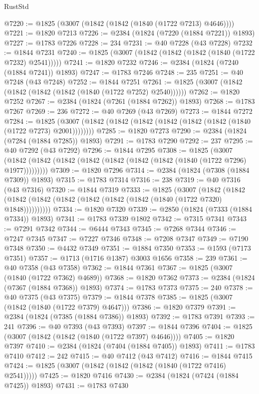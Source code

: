 \begin{lexlean}{RustStd}
\begin{coremodule}
@7220 := @1825 (@3007 (@1842 (@1842 (@1840 (@1722 @7213) @4646))))
@7221 := @1820 @7213
@7226 := @2384 (@1824 (@7220 (@1884 @7221)) @1893)
@7227 := @1783 @7226
@7228 := 234
@7231 := @40 @7228 (@43 @7228)
@7232 := @1844 @7231
@7240 := @1825 (@3007 (@1842 (@1842 (@1842 (@1840 (@1722 @7232) @2541)))))
@7241 := @1820 @7232
@7246 := @2384 (@1824 (@7240 (@1884 @7241)) @1893)
@7247 := @1783 @7246
@7248 := 235
@7251 := @40 @7248 (@43 @7248)
@7252 := @1844 @7251
@7261 := @1825 (@3007 (@1842 (@1842 (@1842 (@1842 (@1840 (@1722 @7252) @2540))))))
@7262 := @1820 @7252
@7267 := @2384 (@1824 (@7261 (@1884 @7262)) @1893)
@7268 := @1783 @7267
@7269 := 236
@7272 := @40 @7269 (@43 @7269)
@7273 := @1844 @7272
@7284 := @1825 (@3007 (@1842 (@1842 (@1842 (@1842 (@1842 (@1842 (@1840 (@1722 @7273) @2001))))))))
@7285 := @1820 @7273
@7290 := @2384 (@1824 (@7284 (@1884 @7285)) @1893)
@7291 := @1783 @7290
@7292 := 237
@7295 := @40 @7292 (@43 @7292)
@7296 := @1844 @7295
@7308 := @1825
    (@3007 (@1842 (@1842 (@1842 (@1842 (@1842 (@1842 (@1842 (@1840 (@1722 @7296) @1977)))))))))
@7309 := @1820 @7296
@7314 := @2384 (@1824 (@7308 (@1884 @7309)) @1893)
@7315 := @1783 @7314
@7316 := 238
@7319 := @40 @7316 (@43 @7316)
@7320 := @1844 @7319
@7333 := @1825
    (@3007
      (@1842 (@1842 (@1842 (@1842 (@1842 (@1842 (@1842 (@1842 (@1840 (@1722 @7320) @1848))))))))))
@7334 := @1820 @7320
@7339 := @2850 (@1824 (@7333 (@1884 @7334)) @1893)
@7341 := @1783 @7339 @1802
@7342 := @7315 @7341
@7343 := @7291 @7342
@7344 := @6444 @7343
@7345 := @7268 @7344
@7346 := @7247 @7345
@7347 := @7227 @7346
@7348 := @7208 @7347
@7349 := @7190 @7348
@7350 := @4432 @7349
@7351 := @1884 @7350
@7353 := @1593 (@7173 @7351)
@7357 := @1713 (@1716 @1387) @3003 @1656
@7358 := 239
@7361 := @40 @7358 (@43 @7358)
@7362 := @1844 @7361
@7367 := @1825 (@3007 (@1840 (@1722 @7362) @4689))
@7368 := @1820 @7362
@7373 := @2384 (@1824 (@7367 (@1884 @7368)) @1893)
@7374 := @1783 @7373
@7375 := 240
@7378 := @40 @7375 (@43 @7375)
@7379 := @1844 @7378
@7385 := @1825 (@3007 (@1842 (@1840 (@1722 @7379) @4647)))
@7386 := @1820 @7379
@7391 := @2384 (@1824 (@7385 (@1884 @7386)) @1893)
@7392 := @1783 @7391
@7393 := 241
@7396 := @40 @7393 (@43 @7393)
@7397 := @1844 @7396
@7404 := @1825 (@3007 (@1842 (@1842 (@1840 (@1722 @7397) @4646))))
@7405 := @1820 @7397
@7410 := @2384 (@1824 (@7404 (@1884 @7405)) @1893)
@7411 := @1783 @7410
@7412 := 242
@7415 := @40 @7412 (@43 @7412)
@7416 := @1844 @7415
@7424 := @1825 (@3007 (@1842 (@1842 (@1842 (@1840 (@1722 @7416) @2541)))))
@7425 := @1820 @7416
@7430 := @2384 (@1824 (@7424 (@1884 @7425)) @1893)
@7431 := @1783 @7430

\end{coremodule}
\end{lexlean}
